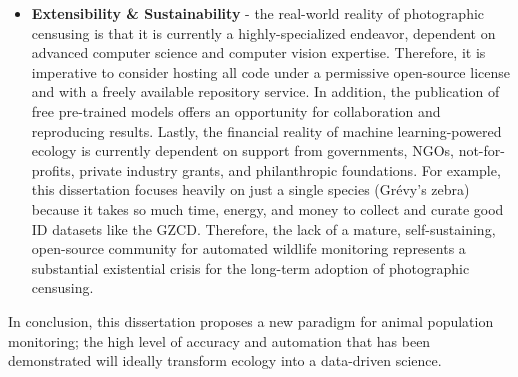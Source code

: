 \begin{itemize}
    \item \textbf{Extensibility \& Sustainability} - the real-world reality of photographic censusing is that it is currently a highly-specialized endeavor, dependent on advanced computer science and computer vision expertise.  Therefore, it is imperative to consider hosting all code under a permissive open-source license and with a freely available repository service. In addition, the publication of free pre-trained models offers an opportunity for collaboration and reproducing results.  Lastly, the financial reality of machine learning-powered ecology is currently dependent on support from governments, NGOs, not-for-profits, private industry grants, and philanthropic foundations. For example, this dissertation focuses heavily on just a single species (Gr\'evy's zebra) because it takes so much time, energy, and money to collect and curate good ID datasets like the GZCD.  Therefore, the lack of a mature, self-sustaining, open-source community for automated wildlife monitoring represents a substantial existential crisis for the long-term adoption of photographic censusing.
\end{itemize}

\noindent In conclusion, this dissertation proposes a new paradigm for animal population monitoring; the high level of accuracy and automation that has been demonstrated will ideally transform ecology into a data-driven science.
